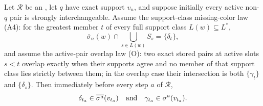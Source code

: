 \begin{helper}
Let \(\mathcal R\) be an
, let \(q\) have exact support
\(v_n\), and suppose initially every active non-\(q\) pair is strongly
interchangeable. Assume the support-class missing-color law (A4): for the
greatest member \(t\) of every full support class \(L(w)\subseteq L^*\),
\[
 \overline\sigma_n(w)\cap\bigcup_{s\in L(w)}S_s=\{\delta_t\},
\]
and assume the active-pair overlap law (O): two exact stored pairs at active
slots \(s<t\) overlap exactly when their supports agree and no member of that
support class lies strictly between them; in the overlap case their
intersection is both \(\{\gamma_t\}\) and \(\{\delta_s\}\). Then immediately
before every step \(a\) of \(\mathcal R\),
\[
 \delta_{t_a}\in\overline{\sigma^a}(v_{t_a})
 \quad\hbox{and}\quad
 \gamma_{t_a}\in\sigma^a(v_{t_a}).
\]
\end{helper}
